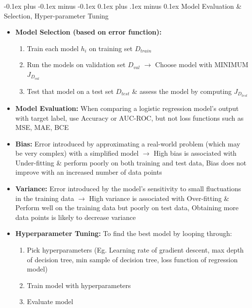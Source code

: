 \documentclass[landscape]{article}
\makeatletter
\renewcommand{\subsection}{\@startsection{subsection}{2}{0mm}%
  {-0.1ex plus -0.1ex minus -0.1ex}%
  {0.1ex plus .1ex minus 0.1ex}%
{\normalfont\scriptsize\bfseries}}
\makeatother
\begin{document}
\begin{multicols*}{5}
        \subsection{Model Evaluation \& Selection, Hyper-parameter Tuning}
        \begin{itemize}
          \item \textbf{Model Selection (based on error function):}
          \begin{enumerate}
            \item Train each model $h_i$ on training set $D_{train}$
            \item Run the models on validation set $D_{val}$ $\rightarrow$ Choose model with MINIMUM $J_{D_{val}}$
            \item Test that model on a test set $D_{test}$ \& assess the model by computing $J_{D_{test}}$
          \end{enumerate}
          \item \textbf{Model Evaluation:} When comparing a logistic regression model's output with target label, use Accuracy or AUC-ROC, but not loss functions such as MSE, MAE, BCE
          \item \textbf{Bias:} Error introduced by approximating a real-world problem (which may be very complex) with a simplified model $\rightarrow$ High bias is associated with Under-fitting \& perform poorly on both training and test data, Bias does not improve with an increased number of data points
          \item \textbf{Variance:} Error introduced by the model's sensitivity to small fluctuations in the training data $\rightarrow$ High variance is associated with Over-fitting \& Perform well on the training data but poorly on test data, Obtaining more data points is likely to decrease variance
          \item \textbf{Hyperparameter Tuning:} To find the best model by looping through:
          \begin{enumerate}
            \item Pick hyperparameters (Eg. Learning rate of gradient descent, max depth of decision tree, min sample of decision tree, loss function of regression model)
            \item Train model with hyperparameters
            \item Evaluate model
          \end{enumerate}
        \end{itemize}


\end{multicols*}
\end{document}

